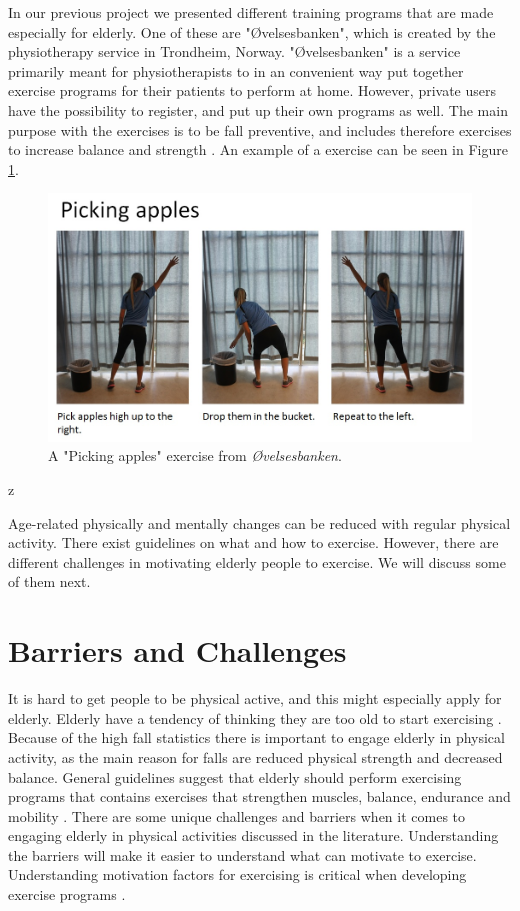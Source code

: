 In our previous project \cite{project} we presented different training programs that are made especially for elderly. One of these are "Øvelsesbanken", which is created by the physiotherapy service in Trondheim, Norway.  "Øvelsesbanken" is a service primarily meant for physiotherapists to in an convenient way put together exercise programs for their patients to perform at home. However, private users have the possibility to register, and put up their own programs as well. The main purpose with the exercises is to be fall preventive, and includes therefore exercises to increase balance and strength \cite{eldretrening}.  An example of a exercise can be seen in Figure \ref{pickingapples}.

\begin{figure} [H]
\centering
\includegraphics[scale=0.5]{PickingApplesAlone.jpg}
\caption[Exercise - picking apples]{A "Picking apples" exercise from \emph{Øvelsesbanken}.}
\label{pickingapples}
\end{figure}z

Age-related physically and mentally changes can be reduced with regular physical activity. There exist guidelines on what and how to exercise. However, there are different challenges in motivating elderly people to exercise. We will discuss some of them next. 

\section{Barriers and Challenges}
\label{sec:barriers}
It is hard to get people to be physical active, and this might especially apply for elderly. Elderly have a tendency of thinking they are too old to start exercising \cite{schutzer}. Because of the high fall statistics there is important to engage elderly in physical activity, as the main reason for falls are reduced physical strength and decreased balance. General guidelines suggest that elderly should perform exercising programs that contains exercises that strengthen muscles, balance, endurance and mobility \cite{gruppetrening-trheim}. There are some unique challenges and barriers when it comes to engaging elderly in physical activities discussed in the literature. Understanding the barriers will make it easier to understand what can motivate to exercise. Understanding motivation factors for exercising is critical when developing exercise programs \cite{chao}.

